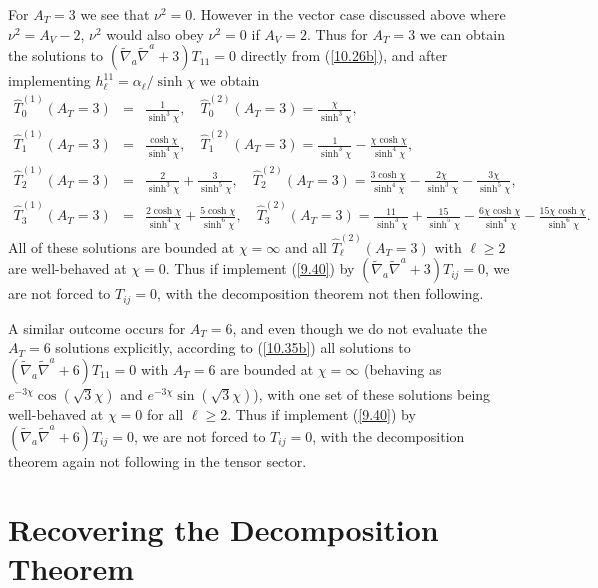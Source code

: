 \documentclass[aps,onecolumn,10pt]{revtex4}
\numberwithin{equation}{section}
\numberwithin{equation}{section}
\begin{document}
For $A_T=3$ we see that $\nu^2=0$. However in the vector case discussed above where $\nu^2=A_V-2$, $\nu^2$ would also obey $\nu^2=0$ if $A_V=2$. Thus for $A_T=3$ we can obtain the solutions to $(\tilde{\nabla}_a\tilde{\nabla}^a+3)T_{11}=0$ directly from (\ref{10.26b}), and after implementing $h^{11}_{\ell}=\alpha_{\ell}/\sinh\chi$ we obtain 
%
\begin{eqnarray}
\hat{T}^{(1)}_0(A_T=3)&=&\frac{1}{ \sinh^3\chi},\quad \hat{T}^{(2)}_0(A_T=3)=\frac{\chi }{\sinh^3\chi},
\nonumber\\
\hat{T}^{(1)}_1(A_T=3)&=&\frac{\cosh \chi }{ \sinh^4\chi},\quad \hat{T}^{(2)}_1(A_T=3)=\frac{1}{ \sinh^3\chi}-\frac{\chi\cosh\chi}{\sinh^4\chi},
\nonumber\\
\hat{T}^{(1)}_2(A_T=3)&=&\frac{2}{ \sinh^3\chi}+\frac{3}{\sinh^5\chi},\quad \hat{T}^{(2)}_2(A_T=3)=\frac{3\cosh\chi}{\sinh^4\chi}-\frac{2\chi}{\sinh^3\chi}-\frac{3\chi }{\sinh^5\chi},
\nonumber\\
\hat{T}^{(1)}_3(A_T=3)&=&\frac{2\cosh\chi}{\sinh^4\chi}+\frac{5\cosh\chi}{\sinh^6\chi},\quad \hat{T}^{(2)}_3(A_T=3)=\frac{11}{\sinh^3\chi}+\frac{15}{\sinh^5\chi}-\frac{6\chi\cosh\chi}{\sinh^4\chi}-\frac{15\chi\cosh\chi }{\sinh^6\chi}.~~~
\label{10.38b}
\end{eqnarray}
%
All of these solutions are bounded at $\chi=\infty$ and all $\hat{T}^{(2)}_{\ell}(A_T=3)$ with $\ell\geq 2$ are well-behaved at $\chi=0$.  Thus if implement (\ref{9.40}) by $(\tilde{\nabla}_a\tilde{\nabla}^a+3)T_{ij}=0$,  we are not forced to $T_{ij}=0$, with the decomposition theorem not then following.

A similar outcome occurs for $A_T=6$, and even though we do not evaluate the $A_T=6$ solutions explicitly, according to (\ref{10.35b}) all solutions to $(\tilde{\nabla}_a\tilde{\nabla}^a+6)T_{11}=0$ with $A_T=6$ are bounded at $\chi=\infty$ (behaving as $e^{-3\chi}\cos(\surd{3}\chi)$ and $e^{-3\chi}\sin(\surd{3}\chi)$), with one set of these solutions being well-behaved at $\chi=0$ for all $\ell \geq 2$.  Thus if implement (\ref{9.40}) by $(\tilde{\nabla}_a\tilde{\nabla}^a+6)T_{ij}=0$,  we are not forced to $T_{ij}=0$, with the decomposition theorem again not following in the tensor sector.

\section{Recovering the Decomposition Theorem}
\label{S11}
\end{document}
